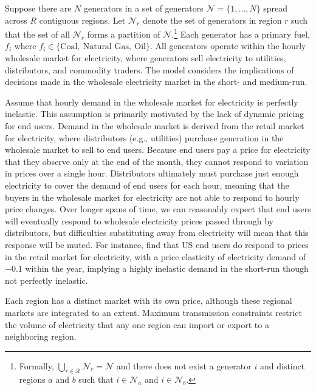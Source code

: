 Suppose there are $N$ generators in a set of generators $\mathcal{N} = \{1, \ldots, N\}$ spread across $R$ contiguous regions. Let $\mathcal{N}_r$ denote the set of generators in region $r$ such that the set of all $\mathcal{N}_r$ forms a partition of $\mathcal{N}$.\footnote{Formally, $\bigcup_{r\in \mathcal{R}} \mathcal{N}_r = \mathcal{N}$ and there does not exist a generator $i$ and distinct regions $a$ and $b$ such that $i \in \mathcal{N}_a$ and $i \in \mathcal{N}_b$.} Each generator has a primary fuel, $f_i$ where $f_i \in \{\text{Coal},~ \text{Natural Gas},~ \text{Oil}\}$. All generators operate within the hourly wholesale market for electricity, where generators sell electricity to utilities, distributors, and commodity traders. The model considers the implications of decisions made in the wholesale electricity market in the short- and medium-run. 

Assume that hourly demand in the wholesale market for electricity is perfectly inelastic. This assumption is primarily motivated by the lack of dynamic pricing for end users. Demand in the wholesale market is derived from the retail market for electricity, where distributors (e.g., utilities) purchase generation in the wholesale market to sell to end users. Because end users pay a price for electricity that they observe only at the end of the month, they cannot respond to variation in prices over a single hour. Distributors ultimately must purchase just enough electricity to cover the demand of end users for each hour, meaning that the buyers in the wholesale market for electricity are not able to respond to hourly price changes. Over longer spans of time, we can reasonably expect that end users will eventually respond to wholesale electricity prices passed through by distributors, but difficulties substituting away from electricity will mean that this response will be muted. For instance, \cite{burke2018price} find that US end users do respond to prices in the retail market for electricity, with a price elasticity of electricity demand of $-0.1$ within the year, implying a highly inelastic demand in the short-run though not perfectly inelastic. 

Each region has a distinct market with its own price, although these regional markets are integrated to an extent. Maximum transmission constraints restrict the volume of electricity that any one region can import or export to a neighboring region.

